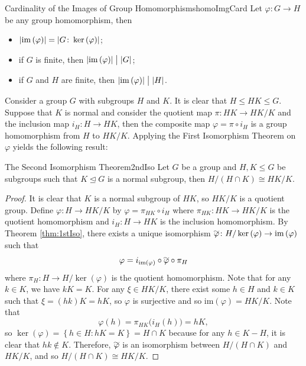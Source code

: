 \documentclass[math]{amznotes}
\renewcommand\widetilde[1]{\ThisStyle{%
  \setbox0=\hbox{$\SavedStyle#1$}%
  \stackengine{1pt-\LMpt}{$\SavedStyle#1$}{%
    \stretchto{\scaleto{\SavedStyle\mkern.2mu\sim}{.5467\wd0}}{.5\ht0}%
  }{O}{c}{F}{T}{S}%
}}
\theoremstyle{remark}
\newcommand{\kernel}[1]{\ker\left(#1\right)}
\newcommand{\img}[1]{\mathrm{im}\left(#1\right)}
\newcommand{\0}{\mathbf{0}}
\newcommand{\1}{\mathbf{1}}
\begin{document}
\begin{corbox}{Cardinality of the Images of Group Homomorphisms}{homoImgCard}
    Let $\varphi \colon G \to H$ be any group homomorphism, then 
    \begin{itemize}
        \item $\abs{\img{\varphi}} = \abs{G \colon \kernel{\varphi}}$;
        \item if $G$ is finite, then $\abs{\img{\varphi}} \bigm\vert \abs{G}$;
        \item if $G$ and $H$ are finite, then $\abs{\img{\varphi}} \bigm\vert \abs{H}$.
    \end{itemize}
\end{corbox}
Consider a group $G$ with subgroups $H$ and $K$. It is clear that $H \leq HK \leq G$. Suppose that $K$ is normal and consider the quotient map $\pi \colon HK \to HK \slash K$ and the inclusion map $i_H \colon H \to HK$, then the composite map $\varphi = \pi \circ i_H$ is a group homomorphism from $H$ to $HK \slash K$. Applying the First Isomorphism Theorem on $\varphi$ yields the following result:
\begin{thmbox}{The Second Isomorphism Theorem}{2ndIso}
    Let $G$ be a group and $H, K \leq G$ be subgroups such that $K \trianglelefteq G$ is a normal subgroup, then $H \slash \left(H \cap K\right) \cong HK \slash K$.
    \tcblower
    \begin{proof}
        It is clear that $K$ is a normal subgroup of $HK$, so $HK \slash K$ is a quotient group. Define $\varphi \colon H \to HK \slash K$ by $\varphi = \pi_{HK} \circ i_H$ where $\pi_{HK} \colon HK \to HK \slash K$ is the quotient homomorphism and $i_H \colon H \to HK$ is the inclusion homomorphism. By Theorem \ref{thm:1stIso}, there exists a unique isomorphism $\widetilde{\varphi} \colon H \slash \kernel{\varphi} \to \img{\varphi}$ such that 
        \begin{equation*}
            \varphi = i_{\img{\varphi}} \circ \widetilde{\varphi} \circ \pi_H
        \end{equation*}
        where $\pi_H \colon H \to H \slash \kernel{\varphi}$ is the quotient homomorphism. Note that for any $k \in K$, we have $kK = K$. For any $\xi \in HK \slash K$, there exist some $h \in H$ and $k \in K$ such that $\xi = \left(hk\right)K = hK$, so $\varphi$ is surjective and so $\img{\varphi} = HK \slash K$. Note that 
        \begin{equation*}
            \varphi\left(h\right) = \pi_{HK}\bigl(i_H\left(h\right)\bigr) = hK,
        \end{equation*}
        so $\kernel{\varphi} = \left\{h \in H \colon hK = K\right\} = H \cap K$ because for any $h \in K - H$, it is clear that $hk \notin K$. Therefore, $\widetilde{\varphi}$ is an isomorphism between $H \slash \left(H \cap K\right)$ and $HK \slash K$, and so $H \slash \left(H \cap K\right) \cong HK \slash K$.
    \end{proof}
\end{thmbox}
\end{document}
